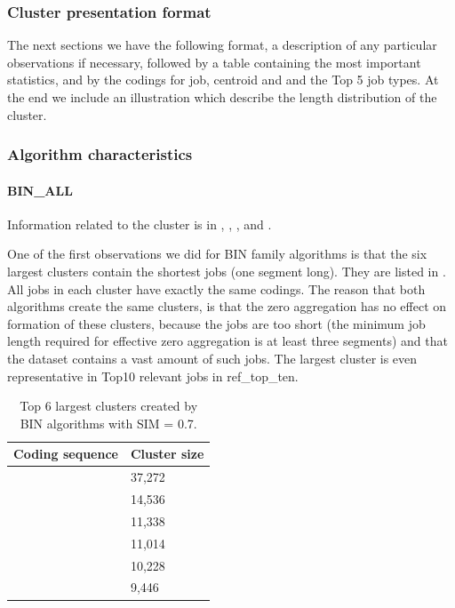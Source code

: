 \documentclass[]{llncs}
\begin{document}
\subsubsection{Cluster presentation format}

The next sections we have the following format, a description of any particular observations if necessary, followed by a table containing the most important statistics, and by the codings for job, centroid and and the Top 5 job types.
At the end we include an illustration which describe the length distribution of the cluster.


\subsubsection{Algorithm characteristics}
\paragraph{BIN\_ALL}
Information related to the cluster is in , , , and .

One of the first observations we did for BIN family algorithms is that the six largest clusters contain the shortest jobs (one segment long).
They are listed in .
All jobs in each cluster have exactly the same codings.
The reason that both algorithms create the same clusters, is that the zero aggregation has no effect on formation of these clusters, because the jobs are too short (the minimum job length required for effective zero aggregation is at least three segments) and that the dataset contains a vast amount of such jobs.
The largest cluster is even representative in Top10 relevant jobs in ref\_top\_ten.

\begin{table}
  \centering
  \begin{tabular}{ll}
    \hline
    Coding sequence & Cluster size \\
    \hline
    [511] &  37,272 \\
    \hline
    [32] &  14,536 \\
    \hline
    [272] &  11,338 \\
    \hline
    [160] &  11,014 \\
    \hline
    [128] &  10,228 \\
    \hline
    [8] &  9,446 \\
    \hline
  \end{tabular}
  \caption{Top 6 largest clusters created by BIN algorithms with SIM = 0.7.}
  \label{tab:bin:largest_clusters}
\end{table}
\end{document}
